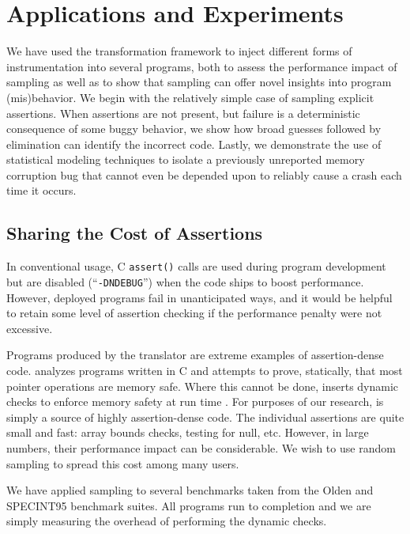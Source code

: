 \section{Applications and Experiments}
\label{sec:applications}

We have used the transformation framework to inject different forms of
instrumentation into several programs, both to assess the performance
impact of sampling as well as to show that sampling can offer novel
insights into program (mis)behavior.  We begin with the relatively
simple case of sampling explicit assertions.  When assertions are not
present, but failure is a deterministic consequence of some buggy
behavior, we show how broad guesses followed by elimination can
identify the incorrect code.  Lastly, we demonstrate the use of
statistical modeling techniques to isolate a previously unreported
memory corruption bug that cannot even be depended upon to reliably
cause a crash each time it occurs.

\subsection{Sharing the Cost of Assertions}
\label{sec:ccured}

In conventional usage, C \texttt{assert()} calls are used during
program development but are disabled (``\texttt{-DNDEBUG}'') when the
code ships to boost performance.  However, deployed programs fail in
unanticipated ways, and it would be helpful to retain some level of
assertion checking if the performance penalty were not excessive.

Programs produced by the \CCured translator are extreme examples of
assertion-dense code.  \CCured analyzes programs written in C and
attempts to prove, statically, that most pointer operations are memory
safe.  Where this cannot be done, \CCured inserts dynamic checks to
enforce memory safety at run time \cite{POPL_'02*128}.  For purposes
of our research, \CCured is simply a source of highly assertion-dense
code.  The individual assertions are quite small and fast: array
bounds checks, testing for null, etc.  However, in large numbers,
their performance impact can be considerable.  We wish to use random
sampling to spread this cost among many users.

We have applied sampling to several benchmarks taken from the Olden
\cite{Carlisle:1996:OPPWDDSDMM} and SPECINT95 \cite{SPEC95} benchmark
suites.  All programs run to completion and we are simply measuring
the overhead of performing the dynamic checks.

